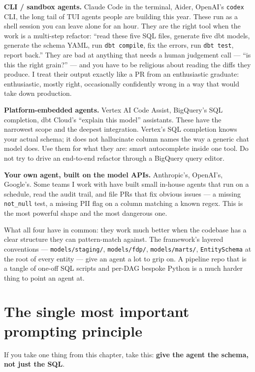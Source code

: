 \documentclass[
  11pt,
  british,
  oneside]{book}
\begin{document}
\textbf{CLI / sandbox agents.} Claude Code in the terminal, Aider,
OpenAI's \texttt{codex} CLI, the long tail of TUI agents people are
building this year. These run as a shell session you can leave alone for
an hour. They are the right tool when the work is a multi-step refactor:
``read these five SQL files, generate five dbt models, generate the
schema YAML, run \texttt{dbt\ compile}, fix the errors, run
\texttt{dbt\ test}, report back.'' They are bad at anything that needs a
human judgement call --- ``is this the right grain?'' --- and you have
to be religious about reading the diffs they produce. I treat their
output exactly like a PR from an enthusiastic graduate: enthusiastic,
mostly right, occasionally confidently wrong in a way that would take
down production.

\textbf{Platform-embedded agents.} Vertex AI Code Assist, BigQuery's SQL
completion, dbt Cloud's ``explain this model'' assistants. These have
the narrowest scope and the deepest integration. Vertex's SQL completion
knows your actual schema; it does not hallucinate column names the way a
generic chat model does. Use them for what they are: smart autocomplete
inside one tool. Do not try to drive an end-to-end refactor through a
BigQuery query editor.

\textbf{Your own agent, built on the model APIs.} Anthropic's, OpenAI's,
Google's. Some teams I work with have built small in-house agents that
run on a schedule, read the audit trail, and file PRs that fix obvious
issues --- a missing \texttt{not\_null} test, a missing PII flag on a
column matching a known regex. This is the most powerful shape and the
most dangerous one.

What all four have in common: they work much better when the codebase
has a clear structure they can pattern-match against. The framework's
layered conventions --- \texttt{models/staging/}, \texttt{models/fdp/},
\texttt{models/marts/}, \texttt{EntitySchema} at the root of every
entity --- give an agent a lot to grip on. A pipeline repo that is a
tangle of one-off SQL scripts and per-DAG bespoke Python is a much
harder thing to point an agent at.

\hypertarget{the-single-most-important-prompting-principle}{%
\section{The single most important prompting
principle}\label{the-single-most-important-prompting-principle}}

If you take one thing from this chapter, take this: \textbf{give the
agent the schema, not just the SQL}.
\end{document}
